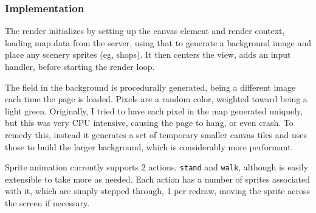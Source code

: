 \documentclass[12pt]{amsart}
\begin{document}
    \subsubsection{Implementation}
      \begin{flushleft}
        The render initializes by setting up the canvas element and render
        context, loading map data from the server, using that to generate a
        background image and place any scenery sprites (eg, shops). It then
        centers the view, adds an input handler, before starting the render
        loop.

        The field in the background is procedurally generated, being a
        different image each time the page is loaded. Pixels are a random
        color, weighted toward being a light green. Originally, I tried to have
        each pixel in the map generated uniquely, but this was very CPU
        intensive, causing the page to hang, or even crash. To remedy this,
        instead it generates a set of temporary smaller canvas tiles and uses
        those to build the larger background, which is considerably more
        performant.

        Sprite animation currently supports 2 actions, \verb/stand/ and
        \verb/walk/, although is easily extensible to take more as needed. Each
        action has a number of sprites associated with it, which are simply
        stepped through, 1 per redraw, moving the sprite across the screen if
        necessary.
      \end{flushleft}
\end{document}
